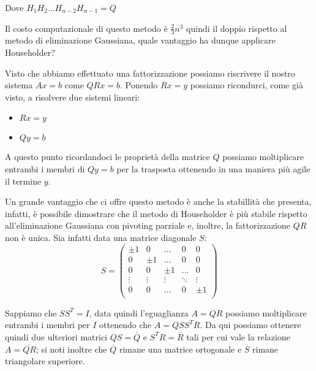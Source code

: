 \documentclass[12pt, a4paper]{book}
\theoremstyle{definition}
\begin{document}
\begin{flushleft}
Dove $H_{1}H_{2} \dots H_{n-2}H_{n-1}  = Q$

Il costo computazionale di questo metodo è $\frac{2}{3}n^{3}$ quindi il doppio rispetto al metodo di eliminazione Gaussiana,  quale vantaggio ha dunque applicare Householder?

Visto che abbiamo effettuato una fattorizzazione possiamo riscrivere il nostro sistema $Ax = b$ come $QRx = b$. Ponendo $Rx = y $ possiamo ricondurci, come già visto, a risolvere due sistemi lineari:

\begin{itemize}
	\item $Rx = y$
	\item $Qy = b$
\end{itemize}

A questo punto ricordandoci le proprietà della matrice $Q$ possiamo moltiplicare entrambi i membri di $Qy = b$ per la trasposta ottenendo in una maniera più agile il termine $y$.

Un grande vantaggio che ci offre questo metodo è anche la stabillità che presenta, infatti,  è possibile dimostrare che il metodo di Householder è più stabile rispetto all'eliminazione Gaussiana con pivoting parziale e, inoltre, la fattorizzazione $QR$ non è unica. Sia infatti data una matrice diagonale $S$:
\[ 
	S = 
	\begin{pmatrix}
		\pm 1 & 0 & \dots & 0 &0 \\
		0 & \pm 1 & \dots & 0 & 0 \\
	    0 & 0 & \pm 1 & \dots & 0  \\
		\vdots &  \vdots &  \vdots  & \ddots & \vdots  \\
		0 & 0 & \dots & 0 & \pm 1 \\
	\end{pmatrix}
\]

Sappiamo che $SS^{T} = I$, data quindi l'eguaglianza $A = QR$ possiamo moltiplicare entrambi i membri per $I$ ottenendo che $A = QSS^{T}R$. Da qui possiamo ottenere quindi due ulteriori matrici $QS = \overline{Q} $ e $S^{T}R = \overline{R}$  tali per cui vale la relazione $A = \overline{QR}$; si noti inoltre che $\overline{Q}$ rimane una matrice ortogonale e $\overline{S}$ rimane triangolare superiore.


\end{flushleft}
\end{document}
